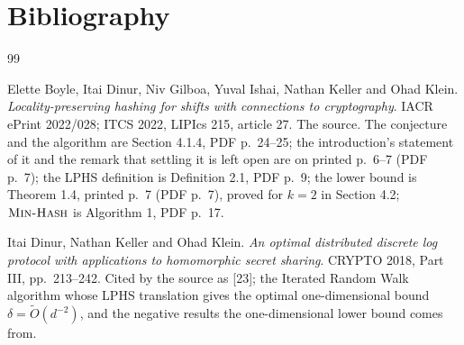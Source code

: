 \documentclass{aicr-conjecture}
\newcommand{\Ot}{\widetilde{O}}
\newcommand{\MinHash}{\textsc{Min-Hash}}
\begin{document}
\section{Bibliography}

\begin{aicrbibliography}{99}

Elette Boyle, Itai Dinur, Niv Gilboa, Yuval Ishai, Nathan Keller and
Ohad Klein.
\emph{Locality-preserving hashing for shifts with connections to
cryptography}.
IACR ePrint 2022/028; ITCS 2022, LIPIcs 215, article 27.
The source. The conjecture and the algorithm are Section 4.1.4, PDF
p.\ 24--25; the introduction's statement of it and the remark that
settling it is left open are on printed p.\ 6--7 (PDF p.\ 7); the LPHS
definition is Definition 2.1, PDF p.\ 9; the lower bound is
Theorem 1.4, printed p.\ 7 (PDF p.\ 7), proved for $k = 2$ in
Section 4.2; $\MinHash$ is Algorithm 1, PDF p.\ 17.

Itai Dinur, Nathan Keller and Ohad Klein.
\emph{An optimal distributed discrete log protocol with applications to
homomorphic secret sharing}.
CRYPTO 2018, Part III, pp.\ 213--242.
Cited by the source as [23]; the Iterated Random Walk algorithm whose
LPHS translation gives the optimal one-dimensional bound
$\delta = \Ot(d^{-2})$, and the negative results the one-dimensional
lower bound comes from.

\end{aicrbibliography}
\end{document}
